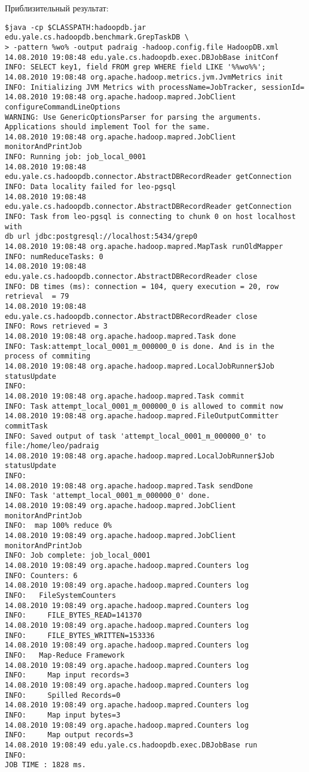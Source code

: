 Приблизительный результат:
\begin{lstlisting}[label=lst:haddop25,caption=Тестирование]
$java -cp $CLASSPATH:hadoopdb.jar edu.yale.cs.hadoopdb.benchmark.GrepTaskDB \
> -pattern %wo% -output padraig -hadoop.config.file HadoopDB.xml
14.08.2010 19:08:48 edu.yale.cs.hadoopdb.exec.DBJobBase initConf
INFO: SELECT key1, field FROM grep WHERE field LIKE '%%wo%%';
14.08.2010 19:08:48 org.apache.hadoop.metrics.jvm.JvmMetrics init
INFO: Initializing JVM Metrics with processName=JobTracker, sessionId=
14.08.2010 19:08:48 org.apache.hadoop.mapred.JobClient configureCommandLineOptions
WARNING: Use GenericOptionsParser for parsing the arguments. 
Applications should implement Tool for the same.
14.08.2010 19:08:48 org.apache.hadoop.mapred.JobClient monitorAndPrintJob
INFO: Running job: job_local_0001
14.08.2010 19:08:48 edu.yale.cs.hadoopdb.connector.AbstractDBRecordReader getConnection
INFO: Data locality failed for leo-pgsql
14.08.2010 19:08:48 edu.yale.cs.hadoopdb.connector.AbstractDBRecordReader getConnection
INFO: Task from leo-pgsql is connecting to chunk 0 on host localhost with 
db url jdbc:postgresql://localhost:5434/grep0
14.08.2010 19:08:48 org.apache.hadoop.mapred.MapTask runOldMapper
INFO: numReduceTasks: 0
14.08.2010 19:08:48 edu.yale.cs.hadoopdb.connector.AbstractDBRecordReader close
INFO: DB times (ms): connection = 104, query execution = 20, row retrieval  = 79
14.08.2010 19:08:48 edu.yale.cs.hadoopdb.connector.AbstractDBRecordReader close
INFO: Rows retrieved = 3
14.08.2010 19:08:48 org.apache.hadoop.mapred.Task done
INFO: Task:attempt_local_0001_m_000000_0 is done. And is in the process of commiting
14.08.2010 19:08:48 org.apache.hadoop.mapred.LocalJobRunner$Job statusUpdate
INFO: 
14.08.2010 19:08:48 org.apache.hadoop.mapred.Task commit
INFO: Task attempt_local_0001_m_000000_0 is allowed to commit now
14.08.2010 19:08:48 org.apache.hadoop.mapred.FileOutputCommitter commitTask
INFO: Saved output of task 'attempt_local_0001_m_000000_0' to file:/home/leo/padraig
14.08.2010 19:08:48 org.apache.hadoop.mapred.LocalJobRunner$Job statusUpdate
INFO: 
14.08.2010 19:08:48 org.apache.hadoop.mapred.Task sendDone
INFO: Task 'attempt_local_0001_m_000000_0' done.
14.08.2010 19:08:49 org.apache.hadoop.mapred.JobClient monitorAndPrintJob
INFO:  map 100% reduce 0%
14.08.2010 19:08:49 org.apache.hadoop.mapred.JobClient monitorAndPrintJob
INFO: Job complete: job_local_0001
14.08.2010 19:08:49 org.apache.hadoop.mapred.Counters log
INFO: Counters: 6
14.08.2010 19:08:49 org.apache.hadoop.mapred.Counters log
INFO:   FileSystemCounters
14.08.2010 19:08:49 org.apache.hadoop.mapred.Counters log
INFO:     FILE_BYTES_READ=141370
14.08.2010 19:08:49 org.apache.hadoop.mapred.Counters log
INFO:     FILE_BYTES_WRITTEN=153336
14.08.2010 19:08:49 org.apache.hadoop.mapred.Counters log
INFO:   Map-Reduce Framework
14.08.2010 19:08:49 org.apache.hadoop.mapred.Counters log
INFO:     Map input records=3
14.08.2010 19:08:49 org.apache.hadoop.mapred.Counters log
INFO:     Spilled Records=0
14.08.2010 19:08:49 org.apache.hadoop.mapred.Counters log
INFO:     Map input bytes=3
14.08.2010 19:08:49 org.apache.hadoop.mapred.Counters log
INFO:     Map output records=3
14.08.2010 19:08:49 edu.yale.cs.hadoopdb.exec.DBJobBase run
INFO: 
JOB TIME : 1828 ms.


\end{lstlisting}
